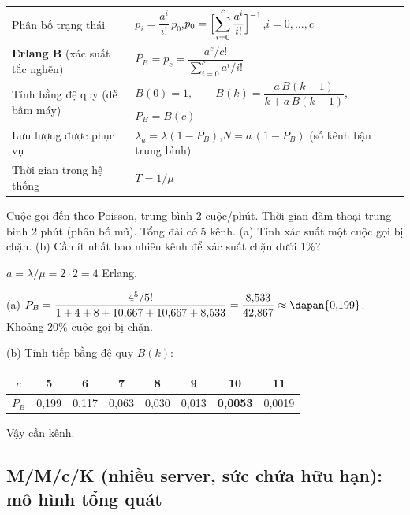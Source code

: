 
\begin{congthuc}
\renewcommand{\arraystretch}{2.2}
\begin{tabular}{@{}l l@{}}
Phân bố trạng thái & $p_i = \dfrac{a^i}{i!}\,p_0$,\qquad $p_0 = \Bigl[\displaystyle\sum_{i=0}^{c}\frac{a^i}{i!}\Bigr]^{-1}$,\qquad $i = 0,\dots,c$ \\
\textbf{Erlang B} (xác suất tắc nghẽn) & $P_B = p_c = \dfrac{a^c/c!}{\displaystyle\sum_{i=0}^{c} a^i/i!}$ \\
Tính bằng đệ quy (dễ bấm máy) & $B(0)=1,\qquad B(k) = \dfrac{a\,B(k-1)}{k + a\,B(k-1)}$,\qquad $P_B = B(c)$ \\
Lưu lượng được phục vụ & $\lambda_a = \lambda(1-P_B)$,\qquad $N = a\,(1-P_B)$ (số kênh bận trung bình) \\
Thời gian trong hệ thống & $T = 1/\mu$ \\
\end{tabular}
\end{congthuc}

\begin{vidu}
Cuộc gọi đến theo Poisson, trung bình 2 cuộc/phút. Thời gian đàm thoại trung bình 2 phút (phân bố mũ). Tổng đài có 5 kênh. (a) Tính xác suất một cuộc gọi bị chặn. (b) Cần ít nhất bao nhiêu kênh để xác suất chặn dưới 1\%?

\loigiai $a = \lambda/\mu = 2\cdot 2 = 4$ Erlang.

(a) $P_B = \dfrac{4^5/5!}{1+4+8+10{,}667+10{,}667+8{,}533} = \dfrac{8{,}533}{42{,}867}\approx \dapan{0{,}199}$. Khoảng 20\% cuộc gọi bị chặn.

(b) Tính tiếp bằng đệ quy $B(k)$:
\begin{center}
\begin{tabular}{@{}c|ccccccc@{}}
$c$ & 5 & 6 & 7 & 8 & 9 & 10 & 11\\ \hline
$P_B$ & 0,199 & 0,117 & 0,063 & 0,030 & 0,013 & \textbf{0,0053} & 0,0019
\end{tabular}
\end{center}
Vậy cần  kênh.
\end{vidu}

\subsection{M/M/c/K (nhiều server, sức chứa hữu hạn): mô hình tổng quát}

